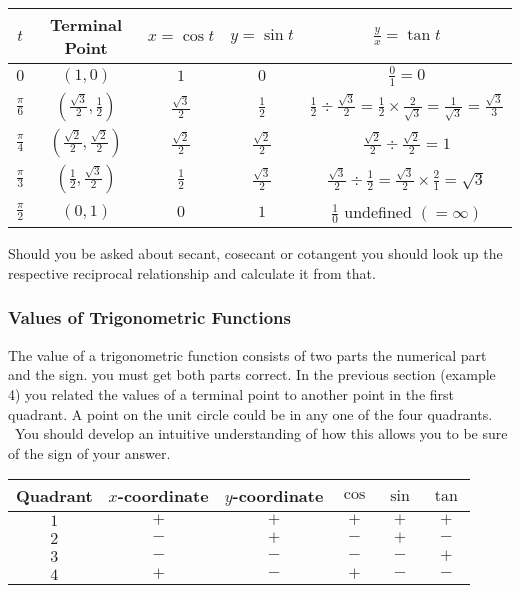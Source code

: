 \qquad \qquad
\begin{tabular}[c]{|c|c|c|c|c|}\hline
	$t$  & Terminal Point  & $x =\cos  t$  & $y =\sin  t$  & $\frac{y}{x} =\tan  t$  \\
	\hline
	$0$  & $\left (1 ,0\right )$  & $1$  & $0$  & $\frac{0}{1} =0$  \\
	\hline
	$\frac{\pi }{6}$  & $\left (\frac{\sqrt{3}}{2} ,\frac{1}{2}\right )$  & $\frac{\sqrt{3}}{2}$  & $\frac{1}{2}$  & $\frac{1}{2} \div \frac{\sqrt{3}}{2} =\frac{1}{2} \times \frac{2}{\sqrt{3}} =\frac{1}{\sqrt{3}} =\frac{\sqrt{3}}{3}$  \\
	\hline
	$\frac{\pi }{4}$  & $\left (\frac{\sqrt{2}}{2} ,\frac{\sqrt{2}}{2}\right )$  & $\frac{\sqrt{2}}{2}$  & $\frac{\sqrt{2}}{2}$  & $\frac{\sqrt{2}}{2} \div \frac{\sqrt{2}}{2} =1$  \\
	\hline
	$\frac{\pi }{3}$  & $\left (\frac{1}{2} ,\frac{\sqrt{3}}{2}\right )$  & $\frac{1}{2}$  & $\frac{\sqrt{3}}{2}$  & $\frac{\sqrt{3}}{2} \div \frac{1}{2} =\frac{\sqrt{3}}{2} \times \frac{2}{1} =\sqrt{3}$  \\
	\hline
	$\frac{\pi }{2}$  & $\left (0 ,1\right )$  & $0$  & $1$  & $\frac{1}{0}$ undefined $\left ( =\infty \right )$  \\
	\hline
\end{tabular}

Should you be asked about secant, cosecant or cotangent you should look up the respective reciprocal relationship and calculate it from that.


\subsubsection{Values of Trigonometric Functions}
The value of a trigonometric function consists of two parts the numerical part and the sign. you
must get both parts correct. In the previous section (example 4) you related the values of a terminal point
to another point in the first quadrant. A point on the unit circle could be in any one of the four quadrants.
\ You should develop an intuitive understanding of how this allows you to be sure of the sign of your answer.


\qquad \qquad \qquad \qquad
\begin{tabular}[c]{|c|c|c|c|c|c|}\hline
	Quadrant  & $x$-coordinate  & $y$-coordinate  & $\cos $  & $\sin $  & $\tan $  \\
	\hline
	$1$  & $ +$  & $ +$  & $ +$  & $ +$  & $ +$  \\
	\hline
	$2$  & $ -$  & $ +$  & $ -$  & $ +$  & $ -$  \\
	\hline
	$3$  & $ -$  & $ -$  & $ -$  & $ -$  & $ +$  \\
	\hline
	$4$  & $ +$  & $ -$  & $ +$  & $ -$  & $ -$  \\
	\hline
\end{tabular}

